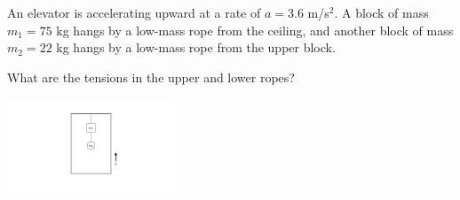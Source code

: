 \question[20] An elevator is accelerating upward at a rate of $a=3.6$ m/s$^2$. A block of mass $m_1=75$ kg hangs by a low-mass rope from the ceiling, and another block of mass $m_2=22$ kg hangs by a low-mass rope from the upper block.

What are the tensions in the upper and lower ropes?
\begin{center}
	\includegraphics[width=5cm]{tension.pdf}
\end{center}
